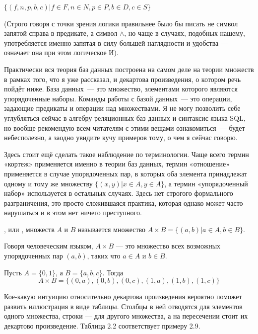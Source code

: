 $\{(f, n, p, b, c)|f\in F, n \in N, p \in P, b \in D, c \in S\}$

(Строго говоря с точки зрения логики правильнее было бы писать не символ запятой справа в предикате, а символ $\wedge$, но чаще в случаях, подобных нашему, употребляется именно запятая в силу большей наглядности и удобства — означает она при этом логическое И).

Практически вся теория баз данных построена на самом деле на теории множеств в рамках того, что я уже рассказал, и декартова произведения, о котором речь пойдёт ниже. База данных~— это множество, элементами которого являются упорядоченные наборы. Команды работы с базой данных~— это операции, задающие предикаты и операции над множествами. Я не могу позволить себе углубляться сейчас в алгебру реляционных баз данных и синтаксис языка SQL, но вообще рекомендую всем читателям с этими вещами ознакомиться~— будет небесполезно, а заодно увидите кучу примеров тому, о чем я сейчас говорю.

Здесь стоит ещё сделать такое наблюдение по терминологии. Чаще всего термин «кортеж» применяется именно в теории баз данных, термин «отношение» применяется в случае упорядоченных пар, в которых оба элемента принадлежат одному и тому же множеству $\{(x, y)|x\in A, y\in A\}$, а термин «упорядоченный набор» используется в остальных случаях. Здесь нет строгого формального разграничения, это просто сложившаяся практика, которая однако может часто нарушаться и в этом нет ничего преступного.

\begin{definition}
, или ,  множеств $A$ и $B$ называется множество $A\times B = \{(a, b)|a\in A, b\in B\}$.
\end{definition}

Говоря человеческим языком, $A\times B$ — это множество всех возможных упорядоченных пар $(a, b)$, таких что $a\in A$ и $b \in B$.

\begin{example}
Пусть $A = \{0, 1\}$, а $B = \{a, b, c\}$. Тогда
$$A\times B = \{(0, a), (0, b), (0, c), (1, a), (1, b), (1, c)\}$$
\end{example}

Кое-какую интуицию относительно декартова произведения вероятно поможет развить иллюстрация в виде таблицы. Столбцы в ней отводятся для элементов одного множества, строки — для другого множества, а на пересечении стоит их декартово произведение. Таблица 2.2 соответствует примеру 2.9.

